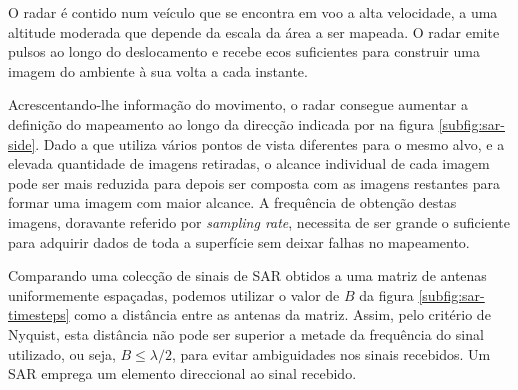 \documentclass[purist,portuguese]{ist-report}
\begin{document}
O radar é contido num veículo que se encontra em voo a alta velocidade, a uma altitude moderada que depende da escala da área a ser mapeada. O radar emite pulsos ao longo do deslocamento e recebe ecos suficientes para construir uma imagem do ambiente à sua volta a cada instante.

Acrescentando-lhe informação do movimento, o radar consegue aumentar a definição do mapeamento ao longo da direcção indicada por  na figura \ref{subfig:sar-side}. Dado a que utiliza vários pontos de vista diferentes para o mesmo alvo, e a elevada quantidade de imagens retiradas, o alcance individual de cada imagem pode ser mais reduzida para depois ser composta com as imagens restantes para formar uma imagem com maior alcance. A frequência de obtenção destas imagens, doravante referido por \textit{sampling rate}, necessita de ser grande o suficiente para adquirir dados de toda a superfície sem deixar falhas no mapeamento.

Comparando uma colecção de sinais de SAR obtidos a uma matriz de antenas uniformemente espaçadas, podemos utilizar o valor de $B$ da figura \ref{subfig:sar-timesteps} como a distância entre as antenas da matriz. Assim, pelo critério de Nyquist, esta distância não pode ser superior a metade da frequência do sinal utilizado, ou seja, $B \leq \lambda/2$, para evitar ambiguidades nos sinais recebidos. Um SAR emprega um elemento direccional ao sinal recebido. 

\printbibliography
\listoftodos
\end{document}
